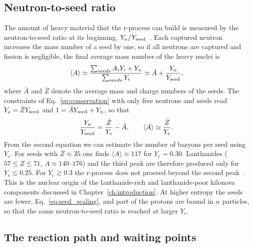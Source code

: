 \subsection{Neutron-to-seed ratio}\label{sec:n_to_seed}

The amount of heavy material that the r-process can build is measured by the neutron-to-seed ratio at its beginning, $Y_n/Y_{\rm seed}$~\cite{qian_origin_2003}.
Each captured neutron increases the mass number of a seed by one, so if all neutrons are captured and fission is negligible, the final average mass number of the heavy nuclei is
\begin{equation}\label{eq:A_final}
  \langle A\rangle\simeq\frac{\sum_{seeds}A_iY_i+Y_n}{\sum_{seeds}Y_i}\simeq\bar A+\frac{Y_n}{Y_{\rm seed}},
\end{equation} 
where $\bar A$ and $\bar Z$ denote the average mass and charge numbers of the seeds.
The constraints of Eq.~\ref{eq:conservation} with only free neutrons and seeds read $Y_e=\bar ZY_{\rm seed}$ and $1=\bar AY_{\rm seed}+Y_n$, so that
\begin{equation}\label{eq:n_to_seed}
  \frac{Y_n}{Y_{\rm seed}}=\frac{\bar Z}{Y_e}-\bar A,\qquad \langle A\rangle\simeq\frac{\bar Z}{Y_e}.
\end{equation}
From the second equation we can estimate the number of baryons per seed using $Y_e$.
For seeds with $\bar Z\approx35$ one finds $\langle A\rangle\approx117$ for $Y_e=0.30$.
Lanthanides ($57\leq Z\leq71$, $A\approx140$--$176$) and the third peak are therefore produced only for $Y_e\lesssim0.25$.
For $Y_e\gtrsim0.3$ the r-process does not proceed beyond the second peak~\cite{lippuner_r-process_2015}.
This is the nuclear origin of the lanthanide-rich and lanthanide-poor kilonova components discussed in Chapter~\ref{ch:introduction}.
At higher entropy the seeds are fewer, Eq.~\ref{eq:seed_scaling}, and part of the protons are bound in $\alpha$ particles, so that the same neutron-to-seed ratio is reached at larger $Y_e$.

\subsection{The reaction path and waiting points}\label{sec:rpath}
 
